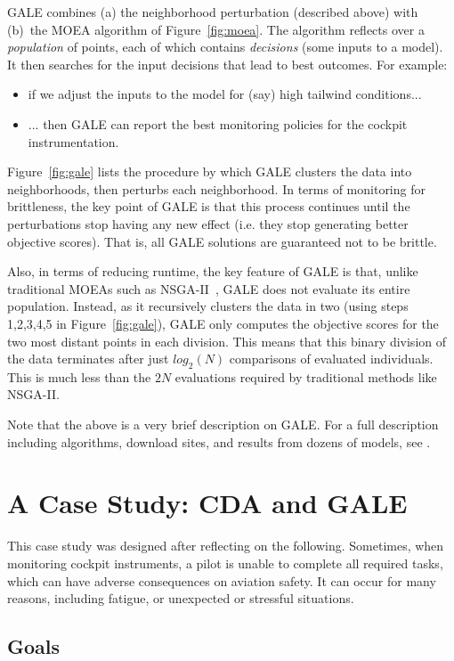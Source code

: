 \documentclass[journal]{IEEEtran}
\newcommand{\fig}[1]{Figure~\ref{fig:#1}}
\begin{document}
GALE combines (a) the neighborhood perturbation (described above) with (b)~the MOEA algorithm of \fig{moea}.
The algorithm reflects over a {\em population} of points, each of which contains {\em decisions} (some inputs to a  model).
It then searches for the input decisions that lead to best outcomes.
For example:
\begin{itemize}
\item
if we adjust the inputs to the model for (say) high tailwind conditions...
\item
... then GALE can report the best monitoring policies for the cockpit instrumentation.
\end{itemize}

\fig{gale} lists the procedure by which GALE clusters the data into neighborhoods, then perturbs each neighborhood.
In terms of monitoring for brittleness, the key point of GALE is that  this process continues until the perturbations stop having any new effect (i.e. they stop generating better objective scores). 
That is, all GALE solutions are guaranteed not to be brittle.


Also, in terms of reducing runtime, the key feature of GALE is that, unlike traditional MOEAs such as NSGA-II~\cite{deb00afast}, GALE does not evaluate its entire population.
Instead, as it recursively clusters the data in two (using steps 1,2,3,4,5 in \fig{gale}), GALE only computes the objective scores for the two most distant points in each division.  
This means that this binary division of the data terminates after just $log_2(N)$ comparisons of evaluated individuals. 
This is much less than the $2N$ evaluations required by  traditional methods like NSGA-II.

Note that the above is a very brief description on GALE. For a full description including algorithms, download sites, and results
from dozens of models, see \cite{galepaper,krallphd}.

\section{A Case Study:  CDA and GALE}\label{sec:case}

This case study was designed after reflecting on the following.
Sometimes, when monitoring cockpit instruments, a pilot is unable to complete all required tasks, which  can have adverse consequences on aviation safety.
It can occur for many reasons, including fatigue, or
 unexpected or stressful situations.
\subsection{Goals}
\end{document}
